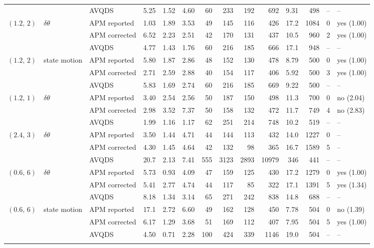\documentclass[10pt]{article}
\begin{document}
\begin{table}[H]
\begin{tabular}{lllrrrrrrrrrrl}
 &  & AVQDS & 5.25 & 1.52 & 4.60 & 60 & 233 & 192 & 692 & 9.31 & 498 & -- & -- \\
\addlinespace[2pt]
$(1.2,\,2)$ & $\delta\theta$ & APM reported & 1.03 & 1.89 & 3.53 & 49 & 145 & 116 & 426 & 17.2 & 1084 & 0 & yes (1.00) \\
 &  & APM corrected & 6.52 & 2.23 & 2.51 & 42 & 170 & 131 & 437 & 10.5 & 960 & 2 & yes (1.00) \\
 &  & AVQDS & 4.77 & 1.43 & 1.76 & 60 & 216 & 185 & 666 & 17.1 & 948 & -- & -- \\
\addlinespace[2pt]
$(1.2,\,2)$ & state motion & APM reported & 5.80 & 1.87 & 2.86 & 48 & 152 & 130 & 478 & 8.79 & 500 & 0 & yes (1.00) \\
 &  & APM corrected & 2.71 & 2.59 & 2.88 & 40 & 154 & 117 & 406 & 5.92 & 500 & 3 & yes (1.00) \\
 &  & AVQDS & 5.83 & 1.69 & 2.74 & 60 & 216 & 185 & 669 & 9.22 & 500 & -- & -- \\
\addlinespace[2pt]
$(1.2,\,1)$ & $\delta\theta$ & APM reported & 3.40 & 2.54 & 2.56 & 50 & 187 & 150 & 498 & 11.3 & 700 & 0 & no (2.04) \\
 &  & APM corrected & 2.98 & 3.52 & 7.37 & 50 & 158 & 132 & 472 & 11.7 & 749 & 4 & no (2.83) \\
 &  & AVQDS & 1.99 & 1.16 & 1.17 & 62 & 251 & 214 & 748 & 10.2 & 519 & -- & -- \\
\addlinespace[2pt]
$(2.4,\,3)$ & $\delta\theta$ & APM reported & 3.50 & 1.44 & 4.71 & 44 & 144 & 113 & 432 & 14.0 & 1227 & 0 & -- \\
 &  & APM corrected & 4.30 & 1.45 & 4.64 & 42 & 132 & 98 & 365 & 16.7 & 1589 & 5 & -- \\
 &  & AVQDS & 20.7 & 2.13 & 7.41 & 555 & 3123 & 2893 & 10979 & 346 & 441 & -- & -- \\
\addlinespace[2pt]
$(0.6,\,6)$ & $\delta\theta$ & APM reported & 5.73 & 0.93 & 4.09 & 47 & 159 & 125 & 430 & 17.2 & 1279 & 0 & yes (1.00) \\
 &  & APM corrected & 5.41 & 2.77 & 4.74 & 44 & 117 & 85 & 322 & 17.1 & 1391 & 5 & yes (1.34) \\
 &  & AVQDS & 8.18 & 1.34 & 3.14 & 65 & 271 & 242 & 838 & 14.8 & 688 & -- & -- \\
\addlinespace[2pt]
$(0.6,\,6)$ & state motion & APM reported & 17.1 & 2.72 & 6.60 & 49 & 162 & 128 & 450 & 7.78 & 504 & 0 & no (1.39) \\
 &  & APM corrected & 6.17 & 1.29 & 3.68 & 51 & 169 & 112 & 407 & 7.95 & 504 & 5 & yes (1.00) \\
 &  & AVQDS & 4.50 & 0.71 & 2.28 & 100 & 424 & 339 & 1146 & 19.0 & 504 & -- & -- \\
\addlinespace[2pt]
\bottomrule\end{tabular}\end{table}
\end{document}
